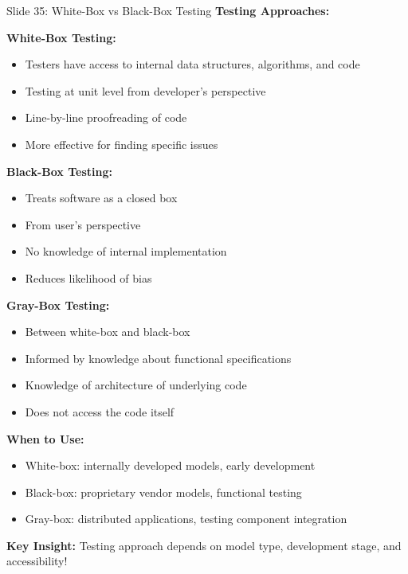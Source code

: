 \documentclass[8pt]{beamer}
\begin{document}
	\begin{frame}{Slide 35: White-Box vs Black-Box Testing}
		\fontsize{6.5}{7.5}\selectfont
		\textbf{Testing Approaches:}
		
		\vspace{0.1cm}
		\textbf{White-Box Testing:}
		\begin{itemize}
			\item Testers have access to internal data structures, algorithms, and code
			\item Testing at unit level from developer's perspective
			\item Line-by-line proofreading of code
			\item More effective for finding specific issues
		\end{itemize}
		
		\vspace{0.1cm}
		\textbf{Black-Box Testing:}
		\begin{itemize}
			\item Treats software as a closed box
			\item From user's perspective
			\item No knowledge of internal implementation
			\item Reduces likelihood of bias
		\end{itemize}
		
		\vspace{0.1cm}
		\textbf{Gray-Box Testing:}
		\begin{itemize}
			\item Between white-box and black-box
			\item Informed by knowledge about functional specifications
			\item Knowledge of architecture of underlying code
			\item Does not access the code itself
		\end{itemize}
		
		\vspace{0.1cm}
		\textbf{When to Use:}
		\begin{itemize}
			\item White-box: internally developed models, early development
			\item Black-box: proprietary vendor models, functional testing
			\item Gray-box: distributed applications, testing component integration
		\end{itemize}
		
		\textcolor{myblue}{\textbf{Key Insight:}} Testing approach depends on \textcolor{myblue}{model type, development stage, and accessibility}!
	\end{frame}
	
\end{document}
